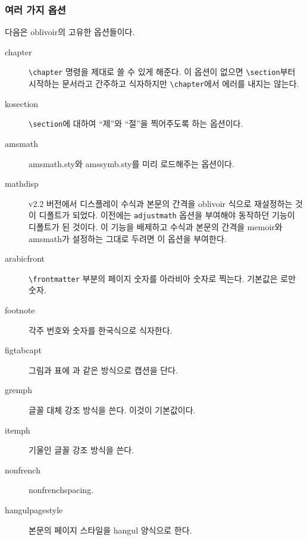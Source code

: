 \documentclass[
	12pt,
	a4paper,
	kosection,
	footnote,
	nobookmarks,
	microtype,
	figtabcapt,
]{oblivoir}
\newcommand\obclass{ob\-liv\-oir\oblivoirallowbreak}
\begin{document}
\subsubsection{여러 가지 옵션}

다음은 \obclass 의 고유한 옵션들이다. 
\begin{description}
\item [chapter] \verb|\chapter| 명령을 제대로 쓸 수 있게 해준다. 이 옵션이 없으면  \verb|\section|부터 시작하는 문서라고 간주하고 식자하지만 \verb|\chapter|에서 에러를 내지는 않는다.
\item [kosection] \verb|\section|에 대하여 ``제''와 ``절''을 찍어주도록 하는 옵션이다.
\item [amsmath] amsmath.sty와 amssymb.sty를 미리 로드해주는 옵션이다.
\item [mathdisp] v2.2 버전에서 디스플레이 수식과 본문의 간격을 oblivoir 식으로 재설정하는 것이 디폴트가 되었다. 이전에는 \verb|adjustmath| 옵션을 부여해야 동작하던 기능이 디폴트가 된 것이다. 이 기능을 배제하고 수식과 본문의 간격을 memoir와 amsmath가 설정하는 그대로 두려면 이 옵션을 부여한다.
\item [arabicfront] \verb|\frontmatter| 부분의 페이지 숫자를 아라비아 숫자로 찍는다. 기본값은 로만 숫자.
\item [footnote] 각주 번호와 숫자를 한국식으로 식자한다.
\item [figtabcapt] 그림과 표에 과 같은 방식으로 캡션을 단다.
\item [gremph] 글꼴 대체 강조 방식을 쓴다. 이것이 기본값이다.
\item [itemph] 기울인 글꼴 강조 방식을 쓴다.
\item [nonfrench] nonfrenchspacing.
\item [hangulpagestyle] 본문의 페이지 스타일을 hangul 양식으로 한다.

\end{description}
\end{document}
